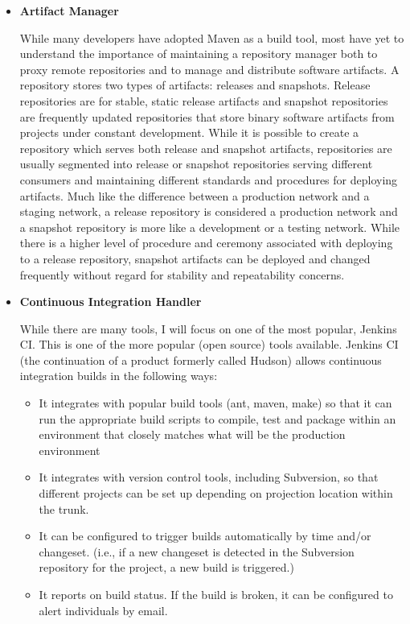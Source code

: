 \documentclass[12pt,a4paper,oneside]{report}
\begin{document}
{\begin{itemize}
\par This practice advocates the use of a revision control system for the project's source code. All artefacts required to build the project should be placed in the repository. In this practice and in the revision control community, the convention is that the system should be buildable from a fresh checkout and not require additional dependencies.  Extreme Programming  mentions that where branching is supported by tools, its use should be minimised.[9] Instead, it is preferred for changes to be integrated rather than for multiple versions of the software to be maintained simultaneously. 
\item \textbf{Artifact Manager}
\par 
While many developers have adopted Maven as a build tool, most have yet to understand the importance of maintaining a repository manager both to proxy remote repositories and to manage and distribute software artifacts. A repository stores two types of artifacts: releases and snapshots. Release repositories are for stable, static release artifacts and snapshot repositories are frequently updated repositories that store binary software artifacts from projects under constant development. While it is possible to create a repository which serves both release and snapshot artifacts, repositories are usually segmented into release or snapshot repositories serving different consumers and maintaining different standards and procedures for deploying artifacts. Much like the difference between a production network and a staging network, a release repository is considered a production network and a snapshot repository is more like a development or a testing network. While there is a higher level of procedure and ceremony associated with deploying to a release repository, snapshot artifacts can be deployed and changed frequently without regard for stability and repeatability concerns.
\item \textbf{Continuous Integration Handler}
\par While there are many tools, I will focus on one of the most popular, Jenkins CI. This is one of the more popular (open source) tools available. Jenkins CI (the continuation of a product formerly called Hudson) allows continuous integration builds in the following ways:
\begin{itemize}
\item It integrates with popular build tools (ant, maven, make) so that it can run the appropriate build scripts to compile, test and package within an environment that closely matches what will be the production environment
\item It integrates with version control tools, including Subversion, so that different projects can be set up depending on projection location within the trunk.
\item It can be configured to trigger builds automatically by time and/or changeset. (i.e., if a new changeset is detected in the Subversion repository for the project, a new build is triggered.)
\item It reports on build status. If the build is broken, it can be configured to alert individuals by email.
\end{itemize}



\end{itemize}}
\end{document}
